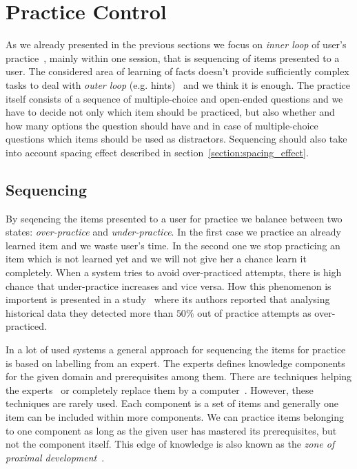 \documentclass[table,color]{fithesis3/fithesis3}
\begin{document}
\section{Practice Control}

As we already presented in the previous sections we focus on \emph{inner loop}
of user's practice~\cite{koedinger2013new}, mainly within one session, that
is sequencing of items presented to a user. The considered area of learning
of facts doesn't provide sufficiently complex tasks to deal with \emph{outer
loop} (e.g. hints)~\cite{koedinger2013new} and we think it is enough. The
practice itself consists of a sequence of multiple-choice and open-ended
questions and we have to decide not only which item should be practiced, but
also whether and how many options the question should have and in case of
multiple-choice questions which items should be used as distractors. Sequencing
should also take into account spacing effect described in
section~\ref{section:spacing_effect}.

\subsection{Sequencing}

By seqencing the items presented to a user for practice we balance between two
states: \emph{over-practice} and \emph{under-practice}. In the first case we
practice an already learned item and we waste user's time. In the second one we
stop practicing an item which is not learned yet and we will not give her a
chance learn it completely. When a system tries to avoid over-practiced
attempts, there is high chance that under-practice increases and vice versa.
How this phenomenon is importent is presented in a study~\cite{cen2007over}
where its authors reported that analysing historical data they detected more
than $50\%$ out of practice attempts as over-practiced.

In a lot of used systems a general approach for sequencing the items for
practice is based on labelling from an expert. The experts defines knowledge
components for the given domain and prerequisites among them. There are
techniques helping the ex\-perts~\cite{niznan2014using} or completely replace
them by a computer~\cite{boros2013automatic}. However, these techniques are
rarely used. Each component is a set of items and generally one item can be
included within more components. We can practice items belonging to one
component as long as the given user has mastered its prerequisites, but not the
component itself. This edge of knowledge is also known as the \emph{zone of
proximal development}~\cite{lee2005signifying}.
\end{document}
